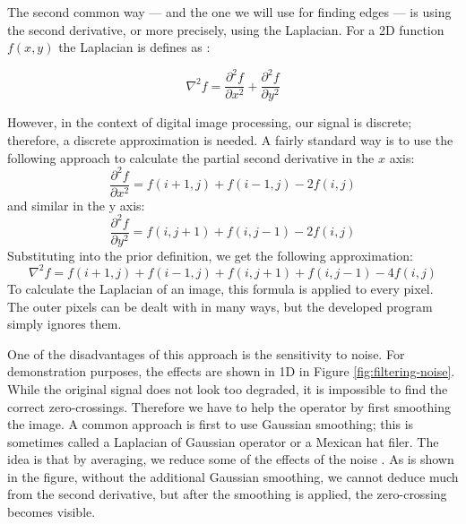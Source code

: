 \documentclass[
  digital,     %
  oneside,     %
  nosansbold,  %
  nocolorbold, %
  lof,         %
  lot,         %
]{fithesis4}
\begin{document}
The second common way --- and the one we will use for finding edges --- is using the second derivative, or more
precisely, using the Laplacian. For a 2D function $f(x, y)$ the Laplacian is
defines as \cite{gonzalez2002}:

$$\nabla^2 f = \frac{\partial^2 f}{\partial x^2} + \frac{\partial^2 f}{\partial y^2}$$

However, in the context of digital image processing, our signal is discrete;
therefore, a discrete approximation is needed. A fairly standard way is to use
the following approach to calculate the partial second derivative in the $x$
axis:
$$\frac{\partial^2 f}{\partial x^2} = f(i + 1, j) + f(i - 1, j) - 2f(i, j)$$
and similar in the y axis:
$$\frac{\partial^2 f}{\partial y^2} = f(i, j + 1) + f(i, j - 1) - 2f(i, j)$$
Substituting into the prior definition, we get the following approximation:
$$\nabla^2 f = f(i+1, j) + f(i-1, j) + f(i, j+1) + f(i, j-1) - 4f(i,j)$$
To calculate the Laplacian of an image, this formula is applied to every pixel.
The outer pixels can be dealt with in many ways, but the developed program simply
ignores them.


One of the disadvantages of this approach is the sensitivity to noise. For
demonstration purposes, the effects are shown in 1D in Figure
\ref{fig:filtering-noise}. While the original
signal does not look too degraded, it is impossible to find the correct
zero-crossings. Therefore we have to help the operator by first smoothing the
image. A common approach is first to use Gaussian smoothing; this is sometimes
called a Laplacian of Gaussian operator or a Mexican hat filer. The idea is that
by averaging, we reduce some of the effects of the noise
\cite{hipr-mexican-hat}. As is shown in the figure, without the additional Gaussian
smoothing, we cannot deduce much from the second derivative, but after the smoothing
is applied, the zero-crossing becomes visible.
\end{document}

